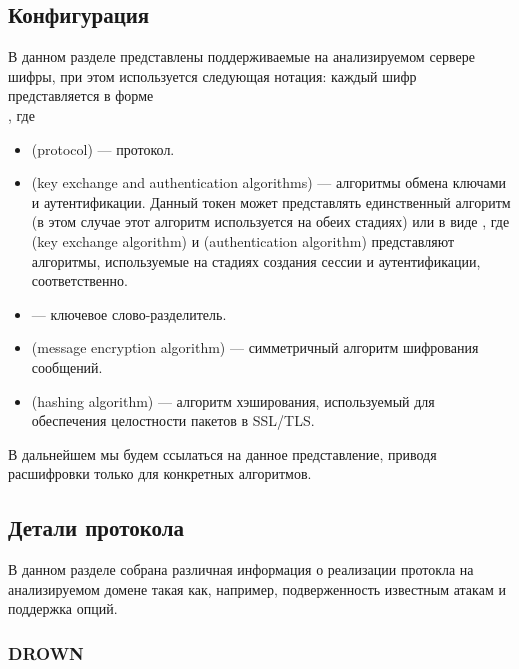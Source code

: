 \subsection{Конфигурация} \label{ssct:best-practices.configuration}

В данном разделе представлены поддерживаемые на анализируемом сервере шифры, при этом используется следующая нотация: каждый шифр
представляется в форме \\ , где 
\begin{itemize}
    \item {} (protocol) --- протокол.
    \item {} (key exchange and authentication algorithms) --- алгоритмы обмена ключами и аутентификации. Данный токен 
        может представлять единственный алгоритм (в этом случае этот алгоритм используется на обеих стадиях) или в виде 
        , где  (key exchange algorithm) и  (authentication algorithm) представляют алгоритмы, 
        используемые на стадиях создания сессии и аутентификации, соответственно.
    \item {} --- ключевое слово-разделитель.
    \item {} (message encryption algorithm) --- симметричный алгоритм шифрования сообщений.
    \item {} (hashing algorithm) --- алгоритм хэширования, используемый для обеспечения целостности пакетов в SSL/TLS.
\end{itemize}
В дальнейшем мы будем ссылаться на данное представление, приводя расшифровки только для конкретных алгоритмов.

\subsection{Детали протокола} \label{ssct:best-practices.protocol-details}

В данном разделе собрана различная информация о реализации протокла на анализируемом домене такая как, например, подверженность 
известным атакам и поддержка опций.

\subsubsection{DROWN}

